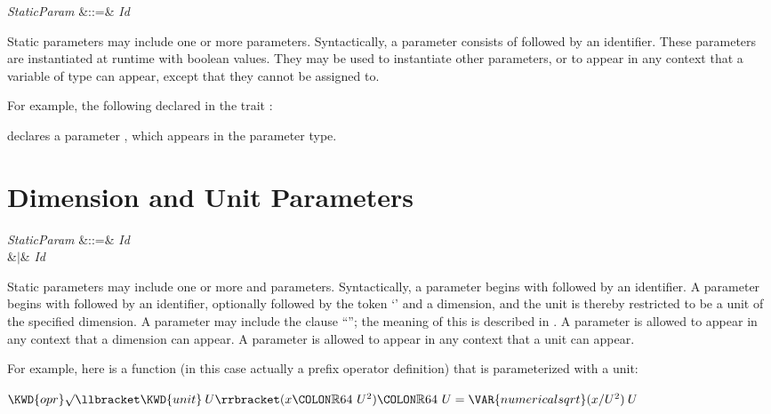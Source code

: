 \begin{Grammar}
\emph{StaticParam} &::=&  \emph{Id} \\
\end{Grammar}

Static parameters may include one or more  parameters.
Syntactically, a  parameter consists of
 followed by an identifier.
These parameters are instantiated at runtime with boolean values. They may
be used to instantiate other  parameters, or
to appear in any context that a variable of type  can appear,
except that they cannot be assigned to.


For example, the following  declared in the trait :

declares a  parameter , which appears in the parameter type.


\section{Dimension and Unit Parameters}

\begin{Grammar}
\emph{StaticParam} &::=&  \emph{Id} \\
&$|$&  \emph{Id} 
 \\
\end{Grammar}


Static parameters may include one or more  and 
parameters.  Syntactically, a  parameter begins with
 followed by an identifier.
A  parameter begins with 
followed by an identifier, optionally followed by the token `\EXP{\COLONOP}'
and a dimension, and the unit is thereby restricted to be a unit of
the specified dimension.
A  parameter may include the clause
``''; the meaning of this is described
in .
A  parameter is allowed to appear in any context that a
dimension can appear.
A  parameter is allowed to appear in any context that a unit
can appear.


For example, here is a function (in this case actually a prefix operator definition) that is parameterized with a unit:
\begin{Fortress}
\(\KWD{opr} \mathord{\surd}\llbracket\KWD{unit}\:U\rrbracket(x\COLON \mathbb{R}64\ U^{2})\COLON \mathbb{R}64\ U = \VAR{numericalsqrt}(x/U^{2})\:U\)
\end{Fortress}


